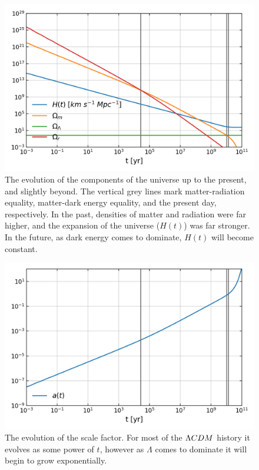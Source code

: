 \begin{figure}[!pth]
\centering     %
    \includegraphics[width=.75\columnwidth]{plots/lcdm_components.png}
\caption{
    The evolution of the components of the universe up to the present, and slightly beyond.
    The vertical grey lines mark matter-radiation equality, matter-dark energy equality,
    and the present day, respectively. In the past, densities of matter and radiation were
    far higher, and the expansion of the universe ($H(t)$) was far stronger.
    In the future, as dark energy comes to dominate, $H(t)$ will become constant.
}\label{fig:lcdm_components}
\end{figure}
\begin{figure}[!pth]
\centering     %
    \includegraphics[width=.75\columnwidth]{plots/lcdm_a.png}
\caption{
    The evolution of the scale factor. For most of the $\Lambda CDM$ history
    it evolves as some power of $t$, however as $\Lambda$ comes to dominate
    it will begin to grow exponentially.
}\label{fig:lcdm_a}
\end{figure}
